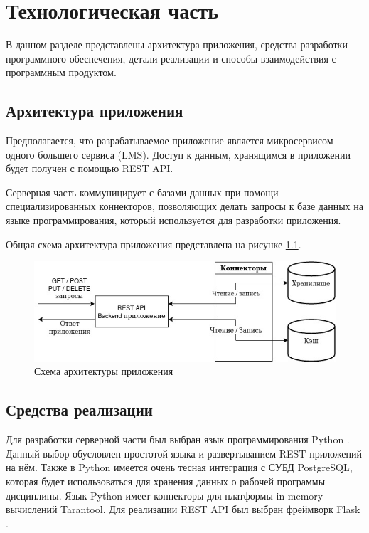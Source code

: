 \chapter{Технологическая часть}

В данном разделе представлены архитектура приложения, средства разработки программного обеспечения, детали реализации и способы взаимодействия с программным продуктом.

\section{Архитектура приложения}

Предполагается, что разрабатываемое приложение является микросервисом одного большего сервиса (LMS). Доступ к данным, хранящимся в приложении будет получен с помощью REST API.

Серверная часть коммуницирует с базами данных при помощи специализированных коннекторов, позволяющих делать запросы к базе данных на языке программирования, который используется для разработки приложения. 

Общая схема архитектура приложения представлена на рисунке \ref{img:app-architecture}.

\begin{figure}[h!]
	\begin{center}
		\includegraphics[scale=0.8]{img/app-arch.jpg}
	\end{center}
	\captionsetup{justification=centering}
	\caption{Схема архитектуры приложения}
	\label{img:app-architecture}
\end{figure}

\section{Средства реализации}

Для разработки серверной части был выбран язык программирования Python \cite{python}. Данный выбор обусловлен простотой языка и развертыванием REST-приложений на нём. Также в Python имеется очень тесная интеграция с СУБД PostgreSQL, которая будет использоваться для хранения данных о рабочей программы дисциплины. Язык Python имеет коннекторы для платформы in-memory вычислений Tarantool. Для реализации REST API был выбран фреймворк Flask \cite{flask}.

